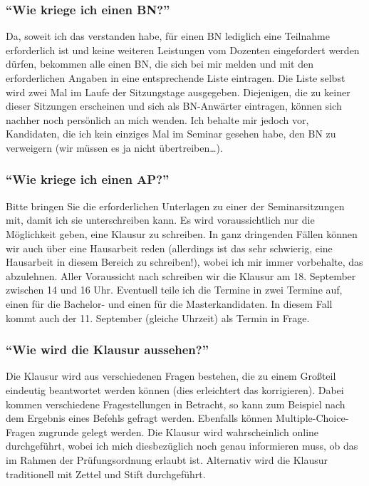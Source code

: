 \subsubsection{\texorpdfstring{{``Wie kriege ich einen
BN?''}}{Wie kriege ich einen BN?}}

Da, soweit ich das verstanden habe, für einen BN lediglich eine
Teilnahme erforderlich ist und keine weiteren Leistungen vom Dozenten
eingefordert werden dürfen, bekommen alle einen BN, die sich bei mir
melden und mit den erforderlichen Angaben in eine entsprechende Liste
eintragen. Die Liste selbst wird zwei Mal im Laufe der Sitzungstage
ausgegeben. Diejenigen, die zu keiner dieser Sitzungen erscheinen und
sich als BN-Anwärter eintragen, können sich nachher noch persönlich an
mich wenden. Ich behalte mir jedoch vor, Kandidaten, die ich kein
einziges Mal im Seminar gesehen habe, den BN zu verweigern (wir müssen
es ja nicht übertreiben\ldots{}).


\subsubsection{\texorpdfstring{{``Wie kriege ich einen
AP?''}}{Wie kriege ich einen AP?}}

Bitte bringen Sie die erforderlichen Unterlagen zu einer der
Seminarsitzungen mit, damit ich sie unterschreiben kann. Es wird
voraussichtlich nur die Möglichkeit geben, eine Klausur zu schreiben. In
ganz dringenden Fällen können wir auch über eine Hausarbeit reden
(allerdings ist das sehr schwierig, eine Hausarbeit in diesem Bereich zu
schreiben!), wobei ich mir immer vorbehalte, das abzulehnen. Aller
Voraussicht nach schreiben wir die Klausur am 18. September zwischen 14
und 16 Uhr. Eventuell teile ich die Termine in zwei Termine auf, einen
für die Bachelor- und einen für die Masterkandidaten. In diesem Fall
kommt auch der 11. September (gleiche Uhrzeit) als Termin in Frage.


\subsubsection{\texorpdfstring{{``Wie wird die Klausur
aussehen?''}}{Wie wird die Klausur aussehen?}}

Die Klausur wird aus verschiedenen Fragen bestehen, die zu einem
Großteil eindeutig beantwortet werden können (dies erleichtert das
korrigieren). Dabei kommen verschiedene Fragestellungen in Betracht, so
kann zum Beispiel nach dem Ergebnis eines Befehls gefragt werden.
Ebenfalls können Multiple-Choice-Fragen zugrunde gelegt werden. Die
Klausur wird wahrscheinlich online durchgeführt, wobei ich mich
diesbezüglich noch genau informieren muss, ob das im Rahmen der
Prüfungsordnung erlaubt ist. Alternativ wird die Klausur traditionell
mit Zettel und Stift durchgeführt.


